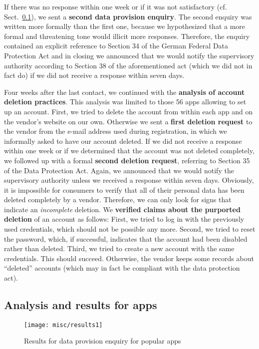 \documentclass{llncs}
\begin{document}
If there was no response within one week or if it was not satisfactory (cf. Sect.~\ref{sec:results1}), we sent a \textbf{second data provision enquiry}. The second enquiry was written more formally than the first one, because we hypothesized that a more formal and threatening tone would illicit more responses. Therefore, the enquiry contained an explicit reference to Section 34 of the German Federal Data Protection Act and in closing we announced that we would notify the supervisory authority according to Section 38 of the aforementioned act (which we did not in fact do) if we did not receive a response within seven days.

Four weeks after the last contact, we continued with the \textbf{analysis of account deletion practices}. This analysis was limited to those 56 apps allowing to set up an account. First, we tried to delete the account from within each app and on the vendor's website on our own.
Otherwise we sent a \textbf{first deletion request} to the vendor from the e-mail address used during registration, in which we informally asked to have our account deleted. If we did not receive a response within one week or if we determined that the account was not deleted completely, we followed up with a formal \textbf{second deletion request}, referring to Section 35 of the Data Protection Act. Again, we announced that we would notify the supervisory authority unless we received a response within seven days.
Obviously, it is impossible for consumers to verify that all of their personal data has been deleted completely by a vendor. Therefore, we can only look for signs that indicate an \emph{incomplete} deletion. We \textbf{verified claims about the purported deletion} of an account as follows: First, we tried to log in with the previously used credentials, which should not be possible any more. Second, we tried to reset the password, which, if successful, indicates that the account had been disabled rather than deleted. Third, we tried to create a new account with the same credentials. This should succeed. Otherwise, the vendor keeps some records about ``deleted'' accounts (which may in fact be compliant with the data protection act).

\subsection{Analysis and results for apps}
\label{sec:results1}

\begin{figure}[t]
\centering
 \texttt{[image: misc/results1]}
 \caption{\label{r1}Results for data provision enquiry for popular apps}
\end{figure}
\end{document}

